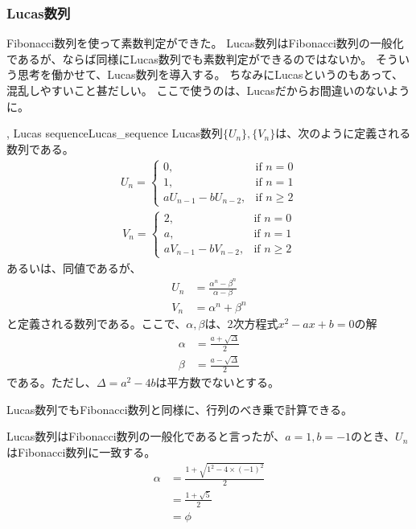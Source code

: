 \subsubsection{Lucas数列}
Fibonacci数列を使って素数判定ができた。
Lucas数列はFibonacci数列の一般化であるが、ならば同様にLucas数列でも素数判定ができるのではないか。
そういう思考を働かせて、Lucas数列を導入する。
ちなみにLucasというのもあって、混乱しやすいこと甚だしい。
ここで使うのは、Lucasだからお間違いのないように。

\begin{Defi}{, Lucas sequence}{Lucas_sequence}
Lucas数列$\{U_n\},\{V_n\}$は、次のように定義される数列である。
\begin{align*}
U_n =
\begin{cases}
0, &\mbox{if } n = 0\\
1, &\mbox{if } n = 1\\
aU_{n - 1} - bU_{n - 2}, &\mbox{if } n \ge 2
\end{cases}
\end{align*}
\begin{align*}
V_n =
\begin{cases}
2, &\mbox{if } n = 0\\
a, &\mbox{if } n = 1\\
aV_{n - 1} - bV_{n - 2}, &\mbox{if } n \ge 2
\end{cases}
\end{align*}
あるいは、同値であるが、
\begin{align*}
U_n &= \frac{\alpha^n - \beta^n}{\alpha - \beta}\\
V_n &= \alpha^n + \beta^n
\end{align*}
と定義される数列である。ここで、$\alpha, \beta$は、2次方程式$x^2-ax+b=0$の解
\begin{align*}
\alpha &= \frac{a+\sqrt{\Delta}}{2}\\
\beta &= \frac{a-\sqrt{\Delta}}{2}
\end{align*}
である。ただし、$\Delta=a^2 - 4b$は平方数でないとする。
\end{Defi}


Lucas数列でもFibonacci数列と同様に、行列のべき乗で計算できる。


Lucas数列はFibonacci数列の一般化であると言ったが、$a=1, b=-1$のとき、$U_n$はFibonacci数列に一致する。
\begin{align*}
\alpha &= \frac{1 + \sqrt{1^2 - 4 \times (-1)^2}}{2}\\
&= \frac{1 + \sqrt{5}}{2}\\
&= \phi
\end{align*}

